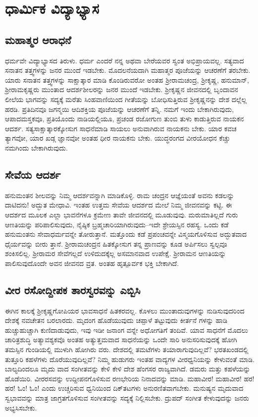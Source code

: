 
\chapter{ಧಾರ್ಮಿಕ ವಿದ್ಯಾಭ್ಯಾಸ}

\section{ಮಹಾತ್ಮರ ಆರಾಧನೆ}

ಧರ್ಮವೇ ವಿದ್ಯಾಭ್ಯಾಸದ ತಿರುಳು. ಧರ್ಮ ಎಂದರೆ ನನ್ನ ಅಥವಾ ಬೇರೆಯವರ ಸ್ವಂತ ಅಭಿಪ್ರಾಯವಲ್ಲ. ಸತ್ಯವಾದ ಸನಾತನ ತತ್ತ್ವಗಳನ್ನು ಜನರ ಮುಂದೆ ಇಡಬೇಕು. ಮೊದಲನೆಯದಾಗಿ ಮಹಾತ್ಮರ ಪೂಜೆಯನ್ನು ಆಚರಣೆಗೆ ತರಬೇಕು. ಯಾರು ಸನಾತನ ತತ್ತ್ವಗಳನ್ನು ಸಾಕ್ಷಾತ್ಕಾರ ಮಾಡಿ ಕೊಂಡಿರುವರೋ ಅಂತಹ ಶ್ರೀರಾಮಚಂದ್ರ, ಶ್ರೀಕೃಷ್ಣ, ಹನುಮಾನ್, ಶ್ರೀರಾಮಕೃಷ್ಣರು ಮುಂತಾದ ಆದರ್ಶಶೀಲರನ್ನು ಜನರ ಮುಂದೆ ಇಡಬೇಕು. ಶ್ರೀಕೃಷ್ಣನ ಜೀವನದಲ್ಲಿ ಬೃಂದಾವನ ಲೀಲೆಯ ಭಾಗವನ್ನು ಸದ್ಯಕ್ಕೆ ಮರೆತು ಸಿಂಹವಾಣಿಯಿಂದ ಗೀತೆಯನ್ನು ಬೋಧಿಸುತ್ತಿರುವ ಶ್ರೀಕೃಷ್ಣನನ್ನು ದೇಶ ದಲ್ಲೆಲ್ಲ ಹರಡಿ. ಪ್ರತಿದಿನವೂ ಜಗನ್ಮಯಿ ಆದಿಶಕ್ತಿಯ ಪೂಜೆಯನ್ನು ಆಚರಣೆಗೆ ತನ್ನಿ. ನಮಗೆ ಇಂದು ಬೇಕಾಗಿರುವುದು, ಆಪಾದಮಸ್ತಕವೂ, ಪ್ರತಿಯೊಂದು ನಾಡಿಯಲ್ಲಿಯೂ, ಪ್ರಚಂಡ ರಜೋಗುಣ ತುಂಬಿ ತುಳು ಕಾಡುತ್ತಿರುವ ನಾಯಕನ ಆದರ್ಶ. ಸತ್ಯಸಾಕ್ಷಾತ್ಕಾರಕ್ಕೋಸುಗ ಸಾಧನೆಮಾಡಿ ಸಾಯಲು ಅನುವಾಗಿರುವ ನಾಯಕನು ಬೇಕು. ಯಾರ ಕವಚ ತ್ಯಾಗವೋ, ಯಾರ ಖಡ್ಗ ಜ್ಞಾನವೋ ಅಂತಹ ಧೀರ ನಾಯಕನು ಬೇಕು. ಯುದ್ಧರಂಗದ ವೀರಯೋಧನ ಕೆಚ್ಚು ನಮಗಿಂದು ಬೇಕಾಗಿರುವುದು.


\section{ಸೇವೆಯ ಆದರ್ಶ}

ಹನುಮಂತನ ಶೀಲವನ್ನು ನಿಮ್ಮ ಆದರ್ಶವನ್ನಾಗಿ ಮಾಡಿಕೊಳ್ಳಿ. ರಾಮ ಚಂದ್ರನ ಆಜ್ಞೆಯಂತೆ ಅವನು ಕಡಲನ್ನು ದಾಟಿದನು! ಅದ್ಭುತ ಮೇಧಾವಿ. ಇಂತಹ ಉತ್ತಮ ಸೇವೆಯ ಆದರ್ಶದ ಮೇಲೆ ನಿಮ್ಮ ಜೀವನವನ್ನು ಕಟ್ಟಿ. ಈ ಆದರ್ಶದ ಮೂಲಕ ಎಲ್ಲಾ ಭಾವನೆಗಳೂ ಕ್ರಮೇಣ ತಾವೇ ಜೀವನದಲ್ಲಿ ಮೂಡುವುವು. ಮರುಮಾತಿಲ್ಲದೆ ಗುರು ಆಣತಿಯನ್ನು ಪರಿಪಾಲಿಸುವುದು, ನೈಷ್ಠಿಕ ಬ್ರಹ್ಮಚಾರಿಯಾಗಿರುವುದು–ಇದೇ ಶ್ರೇಯಸ್ಸಿನ ರಹಸ್ಯ. ಒಂದು ಕಡೆ ಹನುಮಂತನು ಸೇವಾಧರ್ಮವನ್ನೇ ತೋರುತ್ತಾನೆ. ಮತ್ತೊಂದು ಕಡೆ ಪ್ರಪಂಚವನ್ನೇ ವಿಸ್ಮಯಗೊಳಿಸುವ ಅದ್ಭುತವಾದ ಧೈರ್ಯವನ್ನು ಬೀರು ತ್ತಾನೆ. ಶ್ರೀರಾಮಚಂದ್ರನ ಹಿತಕ್ಕೋಸುಗ ತನ್ನ ಪ್ರಾಣವನ್ನು ಕೂಡ ಅರ್ಪಿಸಲು ಸ್ವಲ್ಪವೂ ಶಂಕಿಸಲಿಲ್ಲ. ಶ್ರೀರಾಮರ ಸೇವೆಗಲ್ಲದೆ ಉಳಿದುದಕ್ಕೆಲ್ಲ ಅಸಮಾನವಾದ ಉಪೇಕ್ಷೆ. ಶ್ರೀರಾಮನ ಆಣತಿಯನ್ನು ಪಾಲಿಸುವುದೊಂದೇ ಅವನ ಜೀವನದ ವ್ರತ. ಅಂತಹ ಹೃತ್ಪೂರ್ವಕ ಭಕ್ತಿ ಬೇಕಾಗಿದೆ.


\section{ವೀರ ರಸೋದ್ದೀಪಕ ತಾರಸ್ವರವನ್ನು ಎಬ್ಬಿಸಿ}

ಈಗಿನ ಕಾಲಕ್ಕೆ ಶ್ರೀಕೃಷ್ಣಗೋಪಿಯರ ಭಾವಸಾಧನೆ ಹಿತಕರವಲ್ಲ. ಕೊಳಲು ಮುಂತಾದುವುಗಳನ್ನು ನುಡಿಸುವುದರಿಂದ ದೇಶಕ್ಕೆ ನವಚೇತನ ಬರಲಾರದು. ಮೃದಂಗ ಹೊಡೆಯುವುದು ಚಪ್ಪಾಳೆ ತಟ್ಟುವುದು ಕೀರ್ತನೆ ಗಳನ್ನು ಹಾಡಿ ಹುಚ್ಚುಹುಚ್ಚಾಗಿ ಕುಣಿದಾಡುವುದು, ಇವು ಇಡೀ ಜನಾಂಗ ವನ್ನೇ ಅಧೋಗತಿಗೆ ತಂದಿವೆ. ಯಾವ ಸಾಧನೆಗೆ ಮೊದಲು ಚಾರಿತ್ರಶುದ್ಧಿ ಅತ್ಯಾವಶ್ಯಕವೊ ಅಂತಹ ಅತ್ಯುತ್ತಮವಾದ ಸಾಧನೆಯನ್ನು ಒಂದೇ ಸಾರಿ ಅನುಸರಿಸುವುದಕ್ಕೆ ಹೋಗಿ ತಮಸ್ಸಿನ ಗುಂಡಿಯಲ್ಲಿ ಮುಳುಗಿ ಹೋಗಿರು ವರು. ದೇಶದಲ್ಲಿ ತಮಟೆಗಳು ತಯಾರಾಗುವುದಿಲ್ಲವೆ? ಭರತಖಂಡದಲ್ಲಿ ತುತ್ತೂರಿ ಕಹಳೆಗಳು ದೊರೆಯುವುದಿಲ್ಲವೆ? ನಿಮ್ಮ ಹುಡುಗರು ಇಂತಹ ವಾದ್ಯಗಳ ವೀರಧ್ವನಿಯನ್ನು ಕೇಳುವಂತೆ ಮಾಡಿ. ಬಾಲ್ಯದಿಂದಲೂ ಮೃದು ವಾದ ಸಂಗೀತವನ್ನು ಕೇಳಿ ಕೇಳಿ ದೇಶ ಹೆಂಗಸರ ರಾಜ್ಯವಾಗಿದೆ. ಡಮರು ಮತ್ತು ಕಹಳೆಯನ್ನು ಹೊಡೆಯಿರಿ. ವೀರರಸವನ್ನು ಉದ್ದೀಪನಗೊಳಿಸುವ ರಣಭೇರಿಯ ನಿನಾದವನ್ನು ಮಾಡಿ. ಮಹಾವೀರ! ಮಹಾವೀರ! ಹರ! ಹರ! ಓಂ! ಓಂ! ಎಂದು ಉಚ್ಚರಿಸುವ ಧ್ವನಿಯಿಂದ ದಿಕ್​ತಟಗಳು ಅನುರಣಿತವಾಗಬೇಕು. ಮನುಷ್ಯನ ಮೃದುವಾದ ಸ್ವಭಾವವನ್ನು ಮಾತ್ರ ಜಾಗ್ರತಗೊಳಿಸುವ ಸಂಗೀತವನ್ನು ಸದ್ಯಕ್ಕೆ ನಿಲ್ಲಿಸಬೇಕು. ದ್ರುಪದ್ ಸಂಗೀತ ಕೇಳುವುದನ್ನು ಜನರು ಅಭ್ಯಸಿಸಬೇಕು.

